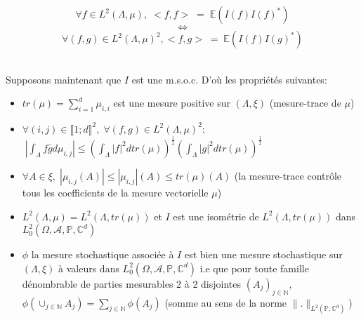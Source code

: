 \begin{remark}
\begin{equation*}
 \forall f \in L^{2}(\Lambda, \mu), \; <f,f>\;=\;\mathbb{E}(I(f)I(f)^{*}) \end{equation*}
\begin{equation} \iff \end{equation}
\begin{equation*}
\forall (f,g) \in L^{2}(\Lambda, \mu)^2,  <f,g>\;=\;\mathbb{E}(I(f)I(g)^{*})
\end{equation*}
\end{remark}
~\\
Supposons maintenant que $I$ est une m.s.o.c. D'où les propriétés suivantes:
\begin{itemize}
\item  $tr(\mu) = \displaystyle\sum_{i=1}^{d} \mu_{i,i}$ est une mesure positive sur $(\Lambda,\xi)$ (mesure-trace de $\mu$) \\ 


\item  $\forall (i,j) \in \llbracket 1;d\rrbracket^2, \;\forall (f,g) \in L^{2}(\Lambda, \mu)^2$:\\$\; |\int_{\Lambda} f\bar{g} d\mu_{i,j} | \leq (\int_{\Lambda} |f|^2 dtr(\mu))^{\frac{1}{2}}(\int_{\Lambda} |g|^2 dtr(\mu))^{\frac{1}{2}}$\\


\item $\forall A \in \xi,\; |\mu_{i,j}(A)| \leq |\mu_{i,j}|(A) \leq tr(\mu)(A)$ (la mesure-trace contrôle tous les coefficients de la mesure vectorielle $\mu$)\\

\item $L^{2}(\Lambda, \mu) = L^{2}(\Lambda, tr(\mu))$ et $I$ est une isométrie de $L^{2}(\Lambda, tr(\mu))$ dans $L^{2}_{0}(\Omega, \mathcal{A}, \mathbb{P}, \mathbb{C}^{d})$\\



\item $\phi$ la mesure stochastique associée à $I$ est bien une mesure stochastique sur $(\Lambda, \xi)$ à valeurs dans $L^{2}_{0}(\Omega, \mathcal{A}, \mathbb{P}, \mathbb{C}^{d})$ i.e que pour toute famille dénombrable de parties mesurables 2 à 2 disjointes $(A_j)_{j \in \mathbb{N}}, \;$\\$\phi(\displaystyle\cup_{j \in \mathbb{N}} A_j) =  \displaystyle\sum_{j \in \mathbb{N}} \phi(A_j) $ (somme au sens de la norme $\|.\|_{L^{2}(\mathbb{P}, \mathbb{C}^d)}$)\\

\end{itemize}

